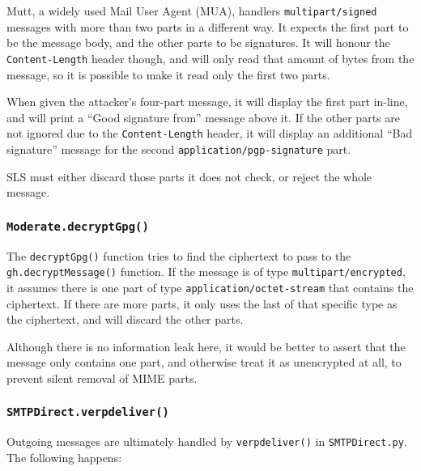 \documentclass[a4]{article}
\newcommand{\file}[1]{\texttt{#1}}
\newcommand{\func}[1]{\texttt{#1()}}
\newcommand{\hdr}[1]{\texttt{#1}}
\newcommand{\mime}[1]{\texttt{#1}}
\begin{document}
Mutt, a widely used Mail User Agent (MUA),
handlers \mime{multipart/signed} messages with more than two parts in a different way.
It expects the first part to be the message body, and the other parts to be signatures.
It will honour the \hdr{Content-Length} header though, and will only read that amount of bytes from the message,
so it is possible to make it read only the first two parts.

When given the attacker's four-part message,
it will display the first part in-line, and will print a ``Good signature from'' message above it.
If the other parts are not ignored due to the \hdr{Content-Length} header,
it will display an additional ``Bad signature'' message for the second \hdr{application/pgp-signature} part.

SLS must either discard those parts it does not check, or reject the whole message.

\subsubsection{\func{Moderate.decryptGpg}}\label{sec:decryptgpg}

The \func{decryptGpg} function tries to find the ciphertext to pass to the \func{gh.decryptMessage} function.
If the message is of type \mime{multipart/encrypted},
it assumes there is one part of type \mime{application/octet-stream} that contains the ciphertext.
If there are more parts, it only uses the last of that specific type as the ciphertext,
and will discard the other parts.

Although there is no information leak here, it would be better to assert that the message only contains one part,
and otherwise treat it as unencrypted at all, to prevent silent removal of MIME parts.

\subsubsection{\func{SMTPDirect.verpdeliver}}\label{sec:smtpdirect}

Outgoing messages are ultimately handled by \func{verpdeliver} in \file{SMTPDirect.py}.
The following happens:
\end{document}
